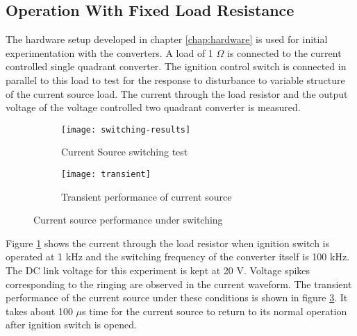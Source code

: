 \subsection{Operation With Fixed Load Resistance}
    The hardware setup developed in chapter \ref{chap:hardware} is used for initial experimentation with the converters. A load of 1 $\Omega$ is connected to the current controlled single quadrant converter. The ignition control switch is connected in parallel to this load to test for the response to disturbance to variable structure of the current source load. The current through the load resistor and the output voltage of the voltage controlled two quadrant converter is measured.
    \begin{figure}[H]
	    \begin{subfigure}{0.49\textwidth}
    		\centering
    		\texttt{[image: switching-results]}
    		\caption{Current Source switching test}
    		\label{fig:sw-results}
		\end{subfigure}
	    \begin{subfigure}{0.49\textwidth}
        	\centering
        	\texttt{[image: transient]}
    		\caption{Transient performance of current source}
    		\label{fig:transient}
		\end{subfigure}
		\caption{Current source performance under switching}
	\end{figure}
	Figure \ref{fig:sw-results} shows the current through the load resistor when ignition switch is operated at 1 kHz and the switching frequency of the converter itself is 100 kHz. The DC link voltage for this experiment is kept at 20 V. Voltage spikes corresponding to the ringing are observed in the current waveform. The transient performance of the current source under these conditions is shown in figure \ref{fig:transient}. It takes about 100 $\mu$s time for the current source to return to its normal operation after ignition switch is opened.
	\begin{comment}
	\begin{figure}[H]
		\centering
		\texttt{[image: vsource-result]}
		\caption{Voltage Source steady state performance}
		\label{fig:vsource-result}
	\end{figure}
	The steady state no load performance of the voltage source is shown in figure \ref{fig:vsource-result}. The conditions for this observations were same as the above.
	\end{comment}
	
